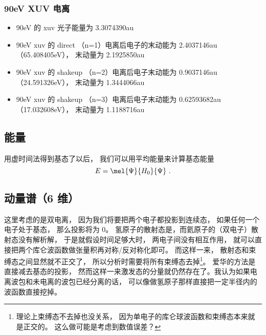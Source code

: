 \subsubsection{90eV XUV 电离}
\begin{itemize}
\item 90eV 的 xuv 光子能量为 3.3074390au

\item 90eV xuv 的 direct （n=1）电离后电子的末动能为 2.4037146au（65.408405eV）， 末动量为 2.1925850au

\item 90eV xuv 的 shakeup （n=2）电离后电子末动能为 0.9037146au （24.591326eV）， 末动量为 1.3444066au

\item 90eV xuv 的 shakeup （n=3）电离后电子末动能为 0.62593682au （17.032608eV）， 末动量为 1.1188716au
\end{itemize}

\subsection{能量}
用虚时间法得到基态了以后， 我们可以用平均能量来计算基态能量
\begin{equation}
E = \mel{\Psi}{H_0}{\Psi}~.
\end{equation}

\subsection{动量谱（6 维）}
这里考虑的是双电离， 因为我们将要把两个电子都投影到连续态， 如果任何一个电子处于基态， 那么投影将为 0。 氢原子的散射态是，而氦原子的（双电子）散射态没有解析解， 于是就假设时间足够大时， 两电子间没有相互作用， 就可以直接把两个库仑波函数做张量积再对称/反对称化即可。 而这样一来， 散射态和束缚态之间显然就不正交了， 所以分析时需要将所有束缚态去掉\footnote{理论上束缚态不去掉也没关系， 因为单电子的库仑球波函数和束缚态本来就是正交的。 这么做可能是考虑到数值误差？}。 爱华的方法是直接减去基态的投影， 然而这样一来激发态的分量就仍然存在了。我认为如果电离波包和未电离的波包已经分离的话， 可以像做氢原子那样直接把一定半径内的波函数直接挖掉。

